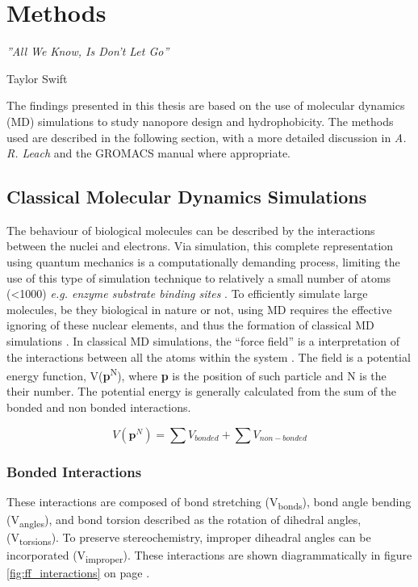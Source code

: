\chapter{Methods}
\label{ch:method}

\epigraph{{\textit{''All We Know, Is Don't Let Go''}}}{Taylor Swift}

The findings presented in this thesis are based on the use of molecular dynamics (MD) simulations to study nanopore design and hydrophobicity. The methods used are described in the following section, with a more detailed discussion in \textit{A. R. Leach} \cite{Leach2001} and the GROMACS manual \cite{Apol2013} where appropriate.

\section{Classical Molecular Dynamics Simulations}
 
The behaviour of biological molecules can be described by the interactions between the nuclei and electrons. Via simulation, this complete representation using quantum mechanics is a computationally demanding process, limiting the use of this type of simulation technique to relatively a small number of atoms (<1000) \textit{e.g. enzyme substrate binding sites} \cite{Senn2007,Senn2009}. To efficiently simulate large molecules, be they biological in nature or not, using MD requires the effective ignoring of these nuclear elements, and thus the formation of classical MD simulations \cite{Leach2001}.
In classical MD simulations, the ``force field'' is a  interpretation of the interactions between all the atoms within the system \cite{Tieleman2010}. The field is a potential energy function, V(\textbf{p}\textsuperscript{N}), where \textbf{p} is the position of such particle and N is the their number. The potential energy is generally calculated from the sum of the bonded and non bonded interactions.

\begin{equation}
V(\textbf{p}^N) = \sum V_{bonded} + \sum V_{non-bonded}
\end{equation}

\subsection{Bonded Interactions}

These interactions are composed of bond stretching (V\textsubscript{bonds}), bond angle bending (V\textsubscript{angles}), and bond torsion described as the rotation of dihedral angles, (V\textsubscript{torsions}). To preserve stereochemistry, improper diheadral angles can be incorporated (V\textsubscript{improper}). These interactions are shown diagrammatically in figure \ref{fig:ff_interactions} on page \pageref{fig:ff_interactions}. 

